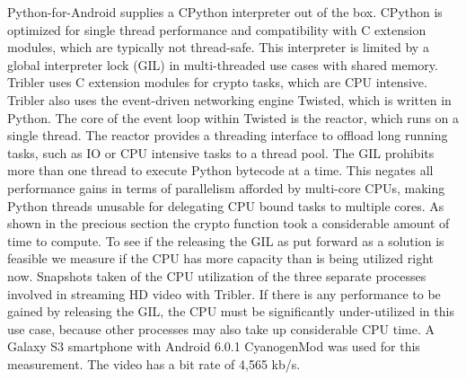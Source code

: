 Python-for-Android supplies a CPython interpreter out of the box.
CPython is optimized for single thread performance and compatibility with C extension modules, which are typically not thread-safe.
This interpreter is limited by a global interpreter lock (GIL) in multi-threaded use cases with shared memory.
Tribler uses C extension modules for crypto tasks, which are CPU intensive.
Tribler also uses the event-driven networking engine Twisted, which is written in Python.
The core of the event loop within Twisted is the reactor, which runs on a single thread.
The reactor provides a threading interface to offload long running tasks, such as IO or CPU intensive tasks to a thread pool.
The GIL prohibits more than one thread to execute Python bytecode at a time.
This negates all performance gains in terms of parallelism afforded by multi-core CPUs, making Python threads unusable for delegating CPU bound tasks to multiple cores.
As shown in the precious section the crypto function took a considerable amount of time to compute.
To see if the releasing the GIL as put forward as a solution is feasible we measure if the CPU has more capacity than is being utilized right now.
Snapshots taken of the CPU utilization of the three separate processes involved in streaming HD video with Tribler.
If there is any performance to be gained by releasing the GIL, the CPU must be significantly under-utilized in this use case, because other processes may also take up considerable CPU time.
A Galaxy S3 smartphone with Android 6.0.1 CyanogenMod was used for this measurement.
The video has a bit rate of 4,565 kb/s.

